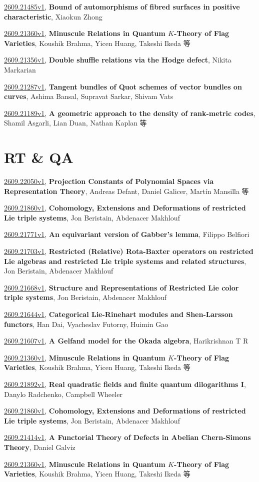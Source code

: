 \documentclass[9pt, a4paper]{article}
\theoremstyle{plain}
\theoremstyle{definition}
\theoremstyle{remark}
\newcommand{\arxiv}[3]{\href{https://arxiv.org/abs/#1}{#1}, \textbf{\textcolor{arxivblue}{#2}}, #3}
\begin{document}
\arxiv{2609.21485v1}{Bound of automorphisms of fibred surfaces in positive characteristic}{Xiaokun Zhong}

\arxiv{2609.21360v1}{Minuscule Relations in Quantum $K$-Theory of Flag Varieties}{Koushik Brahma, Yicen Huang, Takeshi Ikeda 等}

\arxiv{2609.21356v1}{Double shuffle relations via the Hodge defect}{Nikita Markarian}

\arxiv{2609.21287v1}{Tangent bundles of Quot schemes of vector bundles on curves}{Ashima Bansal, Supravat Sarkar, Shivam Vats}

\arxiv{2609.21189v1}{A geometric approach to the density of rank-metric codes}{Shamil Asgarli, Lian Duan, Nathan Kaplan 等}


\section{RT \& QA}
\arxiv{2609.22050v1}{Projection Constants of Polynomial Spaces via Representation Theory}{Andreas Defant, Daniel Galicer, Martín Mansilla 等}

\arxiv{2609.21860v1}{Cohomology, Extensions and Deformations of restricted Lie triple systems}{Jon Beristain, Abdenacer Makhlouf}

\arxiv{2609.21771v1}{An equivariant version of Gabber's lemma}{Filippo Belfiori}

\arxiv{2609.21703v1}{Restricted (Relative) Rota-Baxter operators on restricted Lie algebras and restricted Lie triple systems and related structures}{Jon Beristain, Abdenacer Makhlouf}

\arxiv{2609.21668v1}{Structure and Representations of Restricted Lie color triple systems}{Jon Beristain, Abdenacer Makhlouf}

\arxiv{2609.21644v1}{Categorical Lie-Rinehart modules and Shen-Larsson functors}{Han Dai, Vyacheslav Futorny, Huimin Gao}

\arxiv{2609.21607v1}{A Gelfand model for the Okada algebra}{Harikrishnan T R}

\arxiv{2609.21360v1}{Minuscule Relations in Quantum $K$-Theory of Flag Varieties}{Koushik Brahma, Yicen Huang, Takeshi Ikeda 等}

\arxiv{2609.21892v1}{Real quadratic fields and finite quantum dilogarithms I}{Danylo Radchenko, Campbell Wheeler}

\arxiv{2609.21860v1}{Cohomology, Extensions and Deformations of restricted Lie triple systems}{Jon Beristain, Abdenacer Makhlouf}

\arxiv{2609.21414v1}{A Functorial Theory of Defects in Abelian Chern-Simons Theory}{Daniel Galviz}

\arxiv{2609.21360v1}{Minuscule Relations in Quantum $K$-Theory of Flag Varieties}{Koushik Brahma, Yicen Huang, Takeshi Ikeda 等}

\end{document}
